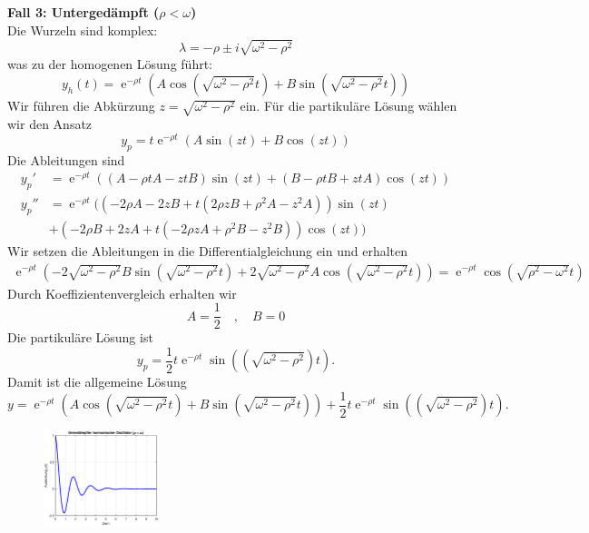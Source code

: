 {\noindent
\textbf{Fall 3: Untergedämpft (\(\rho < \omega\))} \\
Die Wurzeln sind komplex:
\[
\lambda = -\rho \pm i\sqrt{\omega^2 - \rho^2}
\]
was zu der homogenen Lösung führt:
\[
y_h(t) = \operatorname{e}^{-\rho t}(A \cos(\sqrt{\omega^2 - \rho^2} t) + B \sin(\sqrt{\omega^2 - \rho^2} t))
\]
Wir führen die Abkürzung $z = \sqrt{\omega^2 - \rho^2}$ ein.
Für die partikuläre Lösung wählen wir den Ansatz
$$
y_p = t\operatorname{e}^{-\rho t}(A\sin(zt) + B\cos(zt)) 
$$
Die Ableitungen sind
\begin{align*}
y_p' &= \operatorname{e}^{-\rho t}((A- \rho t A - ztB)\sin(zt) + (B-\rho t B + ztA) \cos(zt))\\
y_p'' &= \operatorname{e}^{-\rho t}( (-2\rho A - 2zB + t(2\rho zB + \rho^2 A -z^2A)) \sin(zt) \\
&+
          (-2\rho B +2zA + t(-2\rho zA + \rho^2 B - z^2B)) \cos(zt))
\end{align*}
Wir setzen die Ableitungen in die Differentialgleichung ein und erhalten
\begin{align*}
\operatorname{e}^{-\rho t}(-2\sqrt{\omega^2 - \rho^2}B \sin(\sqrt{\omega^2-\rho^2}t)
+2\sqrt{\omega^2 - \rho^2}A \cos(\sqrt{\omega^2-\rho^2}t) ) = 
 \operatorname{e}^{-\rho t} \cos(\sqrt{\rho^2 - \omega^2}t)
\end{align*}
Durch Koeffizientenvergleich erhalten wir
$$
A= \frac{1}{2} \quad , \quad B =0
$$
Die partikuläre Lösung ist
$$
y_p = \frac{1}{2}t\operatorname{e}^{-\rho t} \sin((\sqrt{\omega^2 - \rho^2})t).
$$
Damit ist die allgemeine Lösung
$$
y = \operatorname{e}^{-\rho t}(A \cos(\sqrt{\omega^2 - \rho^2} t) + B \sin(\sqrt{\omega^2 - \rho^2} t))+\frac{1}{2}t\operatorname{e}^{-\rho t} \sin((\sqrt{\omega^2 - \rho^2})t).
$$

\begin{figure}[h]
    \centering
    \includegraphics[width=0.3\textwidth]{unterdaempfterHarOszil.eps}
\end{figure}
}





